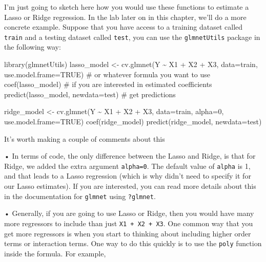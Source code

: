 \documentclass[
  letterpaper,
  DIV=11,
  numbers=noendperiod]{scrreprt}
\newenvironment{Shaded}{\begin{snugshade}}{\end{snugshade}}
\newcommand{\AttributeTok}[1]{\textcolor[rgb]{0.40,0.45,0.13}{#1}}
\newcommand{\CommentTok}[1]{\textcolor[rgb]{0.37,0.37,0.37}{#1}}
\newcommand{\ConstantTok}[1]{\textcolor[rgb]{0.56,0.35,0.01}{#1}}
\newcommand{\DecValTok}[1]{\textcolor[rgb]{0.68,0.00,0.00}{#1}}
\newcommand{\FunctionTok}[1]{\textcolor[rgb]{0.28,0.35,0.67}{#1}}
\newcommand{\NormalTok}[1]{\textcolor[rgb]{0.00,0.23,0.31}{#1}}
\newcommand{\OtherTok}[1]{\textcolor[rgb]{0.00,0.23,0.31}{#1}}
\newcommand{\SpecialCharTok}[1]{\textcolor[rgb]{0.37,0.37,0.37}{#1}}
\begin{document}
I'm just going to sketch here how you would use these functions to
estimate a Lasso or Ridge regression. In the lab later on in this
chapter, we'll do a more concrete example. Suppose that you have access
to a training dataset called \texttt{train} and a testing dataset called
\texttt{test}, you can use the \texttt{glmnetUtils} package in the
following way:

\begin{Shaded}
\begin{Highlighting}[]
\FunctionTok{library}\NormalTok{(glmnetUtils)}
\NormalTok{lasso\_model }\OtherTok{\textless{}{-}} \FunctionTok{cv.glmnet}\NormalTok{(Y }\SpecialCharTok{\textasciitilde{}}\NormalTok{ X1 }\SpecialCharTok{+}\NormalTok{ X2 }\SpecialCharTok{+}\NormalTok{ X3, }\AttributeTok{data=}\NormalTok{train, }\AttributeTok{use.model.frame=}\ConstantTok{TRUE}\NormalTok{) }\CommentTok{\# or whatever formula you want to use}
\FunctionTok{coef}\NormalTok{(lasso\_model) }\CommentTok{\# if you are interested in estimated coefficients}
\FunctionTok{predict}\NormalTok{(lasso\_model, }\AttributeTok{newdata=}\NormalTok{test) }\CommentTok{\# get predictions}

\NormalTok{ridge\_model }\OtherTok{\textless{}{-}} \FunctionTok{cv.glmnet}\NormalTok{(Y }\SpecialCharTok{\textasciitilde{}}\NormalTok{ X1 }\SpecialCharTok{+}\NormalTok{ X2 }\SpecialCharTok{+}\NormalTok{ X3,}
                         \AttributeTok{data=}\NormalTok{train,}
                         \AttributeTok{alpha=}\DecValTok{0}\NormalTok{,}
                         \AttributeTok{use.model.frame=}\ConstantTok{TRUE}\NormalTok{)}
\FunctionTok{coef}\NormalTok{(ridge\_model)}
\FunctionTok{predict}\NormalTok{(ridge\_model, }\AttributeTok{newdata=}\NormalTok{test)}
\end{Highlighting}
\end{Shaded}

It's worth making a couple of comments about this

• In terms of code, the only difference between the Lasso and Ridge, is
that for Ridge, we added the extra argument \texttt{alpha=0}. The
default value of \texttt{alpha} is 1, and that leads to a Lasso
regression (which is why didn't need to specify it for our Lasso
estimates). If you are interested, you can read more details about this
in the documentation for \texttt{glmnet} using \texttt{?glmnet}.

• Generally, if you are going to use Lasso or Ridge, then you would have
many more regressors to include than just \texttt{X1\ +\ X2\ +\ X3}. One
common way that you get more regressors is when you start to thinking
about including higher order terms or interaction terms. One way to do
this quickly is to use the \texttt{poly} function inside the formula.
For example,
\end{document}
